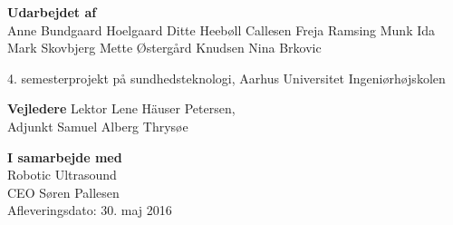 \begin{titlingpage}
\textbf{Udarbejdet af}\\
Anne Bundgaard Hoelgaard \newline
Ditte Heebøll Callesen \newline
Freja Ramsing Munk \newline
Ida Mark Skovbjerg \newline	
Mette Østergård Knudsen \newline 
Nina Brkovic 

4. semesterprojekt på sundhedsteknologi, Aarhus Universitet Ingeniørhøjskolen

\textbf{Vejledere} \newline
Lektor Lene Häuser Petersen, \\
Adjunkt Samuel Alberg Thrysøe

\textbf{I samarbejde med}\\
Robotic Ultrasound\\
CEO Søren Pallesen
\\

Afleveringsdato: 30. maj 2016

\end{titlingpage}